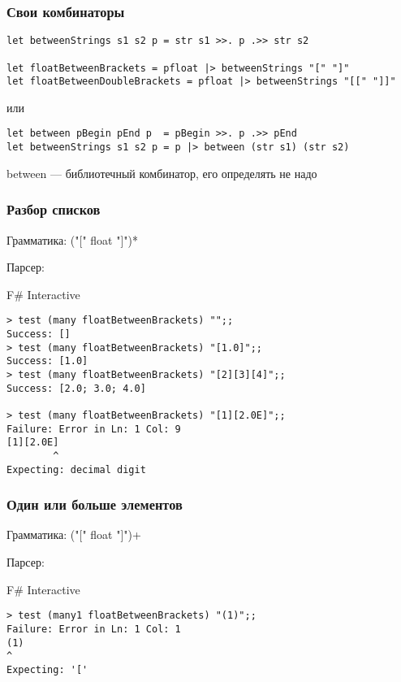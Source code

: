 \documentclass[xetex,mathserif,serif]{beamer}
\begin{document}
    \begin{frame}[fragile]
        \frametitle{Свои комбинаторы}
        \begin{verbatim}
let betweenStrings s1 s2 p = str s1 >>. p .>> str s2

let floatBetweenBrackets = pfloat |> betweenStrings "[" "]"
let floatBetweenDoubleBrackets = pfloat |> betweenStrings "[[" "]]"
        \end{verbatim}

        или

        \begin{verbatim}
let between pBegin pEnd p  = pBegin >>. p .>> pEnd
let betweenStrings s1 s2 p = p |> between (str s1) (str s2)
        \end{verbatim}

        between --- библиотечный комбинатор, его определять не надо
    \end{frame}

    \begin{frame}[fragile]
        \frametitle{Разбор списков}
        Грамматика: ("[" float "]")*

        Парсер:
        \begin{alertblock}{F\# Interactive}
            \begin{verbatim}
> test (many floatBetweenBrackets) "";;
Success: []
> test (many floatBetweenBrackets) "[1.0]";;
Success: [1.0]
> test (many floatBetweenBrackets) "[2][3][4]";;
Success: [2.0; 3.0; 4.0]

> test (many floatBetweenBrackets) "[1][2.0E]";;
Failure: Error in Ln: 1 Col: 9
[1][2.0E]
        ^
Expecting: decimal digit
            \end{verbatim}
        \end{alertblock}
    \end{frame}

    \begin{frame}[fragile]
        \frametitle{Один или больше элементов}
        Грамматика: ("[" float "]")+

        Парсер:
        \begin{alertblock}{F\# Interactive}
            \begin{verbatim}
> test (many1 floatBetweenBrackets) "(1)";;
Failure: Error in Ln: 1 Col: 1
(1)
^
Expecting: '['
            \end{verbatim}
        \end{alertblock}
    \end{frame}
\end{document}
